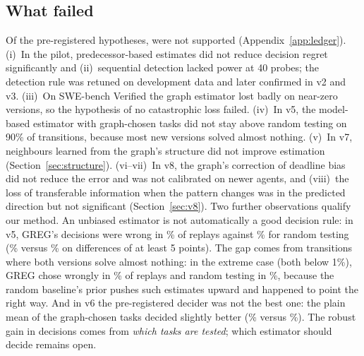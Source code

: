 \documentclass[11pt]{article}
\begin{document}
\subsection{What failed}
\label{sec:failures}
Of the \HypTotal{} pre-registered hypotheses, \HypFailed{} were not supported (Appendix~\ref{app:ledger}). (i)~In the pilot,
predecessor-based estimates did not reduce decision regret significantly and (ii)~sequential detection lacked power
at 40 probes; the detection rule was retuned on development data and later confirmed in v2 and v3. (iii)~On SWE-bench
Verified the graph estimator lost badly on near-zero versions, so the hypothesis of no catastrophic loss failed. (iv)~In v5,
the model-based estimator with graph-chosen tasks did not stay above random testing on 90\% of transitions, because
most new versions solved almost nothing. (v)~In v7, neighbours learned from the graph's structure did not improve
estimation (Section~\ref{sec:structure}). (vi--vii)~In v8, the graph's correction of deadline bias
did not reduce the error and was not calibrated on newer agents, and (viii)~the loss of transferable information when
the pattern changes was in the predicted direction but not significant (Section~\ref{sec:v8}). Two further observations qualify our method. An unbiased estimator is not
automatically a good decision rule: in v5, GREG's decisions were wrong in \DecGregAllFive\% of replays against
\DecResetAllFive\% for random testing (\DecGregFive\% versus \DecResetFive\% on differences of at least 5 points). The
gap comes from transitions where both versions solve almost nothing: in the extreme case (both below 1\%), GREG chose
wrongly in \DecGregExtFive\% of replays and random testing in \DecResetExtFive\%, because the random baseline's
prior pushes such estimates upward and happened to point the right way. And in v6 the pre-registered decider was not the best one: the plain mean of the
graph-chosen tasks decided slightly better (\DecRstratSix\% versus \DecGraphSix\%). The robust gain in decisions comes
from \emph{which tasks are tested}; which estimator should decide remains open.
\end{document}
